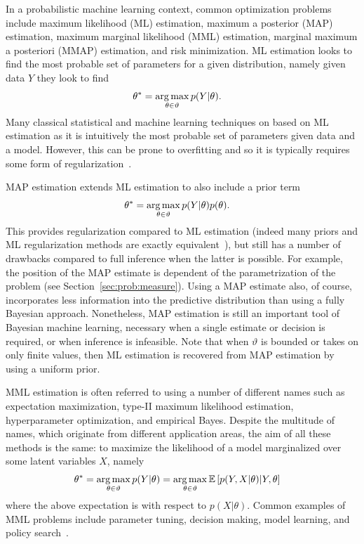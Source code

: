 In a probabilistic machine learning context, common optimization problems 
include maximum likelihood (ML) estimation,
maximum a posterior (MAP) estimation, maximum marginal likelihood (MML) estimation, 
marginal maximum a posteriori (MMAP) estimation,
and risk minimization.  
ML estimation looks to find the most probable set of parameters
for a given distribution, namely given data $Y$ they look to find
\begin{align}
\label{eq:opt:max-lik}
\theta^* &= \operatorname*{arg\,max}_{\theta \in \vartheta} p(Y|\theta).
\end{align}
Many classical statistical and machine learning techniques on based on 
ML estimation as it is intuitively the most probable
set of parameters given data and a model.  However, this can be prone to overfitting and
so it is typically requires some form of regularization~\citep{hastie01statisticallearning}.

MAP estimation extends ML estimation to also include a prior term
\begin{align}
\label{eq:opt:map}
\theta^* &= \operatorname*{arg\,max}_{\theta \in \vartheta} p(Y|\theta) p(\theta).	
\end{align}
This provides regularization compared to ML estimation (indeed many priors and
ML regularization methods are exactly equivalent~\citep{bishop2006pattern}),
but still has a number of drawbacks compared to full inference when the latter is
possible.  For example, the position of the MAP estimate is dependent of the
parametrization of the problem (see Section~\ref{sec:prob:measure}).  Using a MAP estimate also, of course,
incorporates less information into the predictive distribution than using a
fully Bayesian approach.  Nonetheless, MAP estimation is still an important
tool of Bayesian machine learning, necessary when a single estimate or decision is required,
or when inference is infeasible.  Note that when $\vartheta$ is bounded or takes
on only finite values, then ML estimation is recovered from MAP estimation by using
a uniform prior.

MML estimation is often referred to using a number of different names such as expectation
maximization, type-II maximum likelihood estimation, hyperparameter optimization, and
empirical Bayes.  Despite the multitude of names, which originate from different application
areas, the aim of all these methods is the same: to maximize the likelihood of a model
marginalized over some latent variables $X$, namely
\begin{align}
	\label{eq:opt:MML}
	\theta^* &= \operatorname*{arg\,max}_{\theta \in \vartheta} p(Y|\theta) 
	= \operatorname*{arg\,max}_{\theta \in \vartheta} \mathbb{E} \left[p(Y,X|\theta) | Y, \theta\right]
\end{align}
where the above expectation is with respect to $p(X | \theta)$.  Common examples of MML
problems include parameter tuning, decision making, model learning, and policy search~\citep{deisenroth2013survey}.

